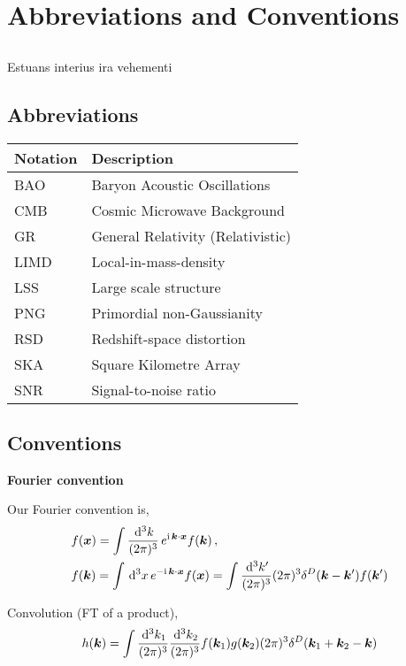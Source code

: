 \chapter*{Abbreviations and Conventions}
\label{chapter:conventions}
\section*{}
\singlespacing

Estuans interius ira vehementi

\section*{Abbreviations}
\setlength{\tabcolsep}{14pt}
\begin{center}
\begin{tabular}{l | l}
	\textbf{Notation} & \textbf{Description} \\
	\hline
	BAO & Baryon Acoustic Oscillations \\
	CMB & Cosmic Microwave Background \\
	GR & General Relativity (Relativistic) \\
	LIMD & Local-in-mass-density \\
	LSS & Large scale structure \\
	PNG & Primordial non-Gaussianity \\
	RSD & Redshift-space distortion \\
	SKA & Square Kilometre Array \\
	SNR & Signal-to-noise ratio 
\end{tabular}
\end{center}
\section*{Conventions}

\textbf{Fourier convention}


Our Fourier convention is, 
\begin{align*}
	&f(\bm {x}) = \int \frac{\,\mathrm{d}^3 k}{(2\pi)^3}\, e^{\mathrm{i\,} \bm {k} \cdot \bm {x}} f(\bm {k})\,,\\
	&f(\bm {k}) = \int \,\mathrm{d}^3x\, e^{- \mathrm{i\,} \bm {k}\cdot\bm {x}} f(\bm {x}) = \int \frac{\,\mathrm{d}^3 k'}{(2\pi)^3} (2\pi)^3 \delta^D(\bm {k}-\bm {k}') f(\bm {k}')
\end{align*}

Convolution (FT of a product), 
\begin{equation*}
	h(\bm {k}) = \int \frac{\,\mathrm{d}^3k_1}{(2\pi)^3} \frac{\,\mathrm{d}^3k_2}{(2\pi)^3} f(\bm {k}_1) g(\bm {k}_2) (2\pi)^3 \delta^D(\bm {k}_1 +\bm {k}_2 - \bm {k})
\end{equation*}





